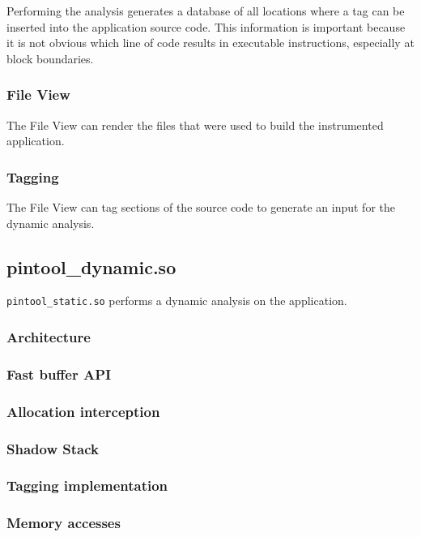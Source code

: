 Performing the analysis generates a database of all locations where a tag can be inserted into the application source code. This information is important because it is not obvious which line of code results in executable instructions, especially at block boundaries.

\subsubsection{File View}

The File View can render the files that were used to build the instrumented application.

\subsubsection{Tagging}

The File View can tag sections of the source code to generate an input for the dynamic analysis. 

\subsection{pintool\_dynamic.so}

\texttt{pintool\_static.so} performs a dynamic analysis on the application.

\subsubsection{Architecture}



\subsubsection{Fast buffer API}
\subsubsection{Allocation interception}
\subsubsection{Shadow Stack}
\subsubsection{Tagging implementation}
\subsubsection{Memory accesses}
